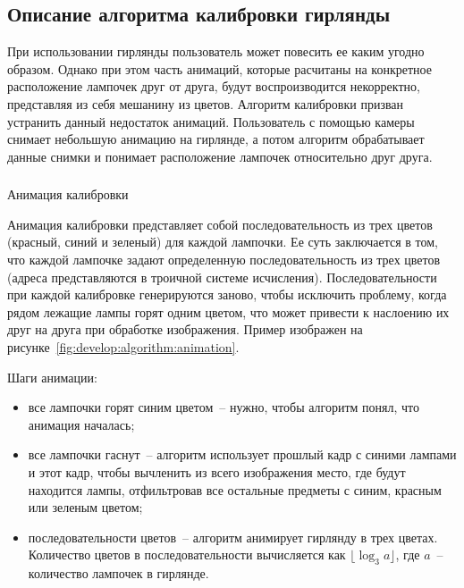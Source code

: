 \newpage
\subsection{Описание алгоритма калибровки гирлянды}
\label{sec:develop:algorithm}

При использовании гирлянды пользователь может повесить ее каким угодно образом. Однако при этом часть анимаций, которые расчитаны на конкретное расположение лампочек друг от друга, будут воспроизводится некорректно, представляя из себя мешанину из цветов. Алгоритм калибровки призван устранить данный недостаток анимаций. Пользователь с помощью камеры снимает небольшую анимацию на гирлянде, а потом алгоритм обрабатывает данные снимки и понимает расположение лампочек относительно друг друга.

\subsubsection{} Анимация калибровки
\label{sec:develop:algorithm:animation}

Анимация калибровки представляет собой последовательность из трех цветов (красный, синий и зеленый) для каждой лампочки. Ее суть заключается в том, что каждой лампочке задают определенную последовательность из трех цветов (адреса представляются в троичной системе исчисления). Последовательности при каждой калибровке генерируются заново, чтобы исключить проблему, когда рядом лежащие лампы горят одним цветом, что может привести к наслоению их друг на друга при обработке изображения. Пример изображен на рисунке~\ref{fig:develop:algorithm:animation}.

Шаги анимации:
\begin{itemize}
	\item все лампочки горят синим цветом~-- нужно, чтобы алгоритм понял, что анимация началась;
	\item все лампочки гаснут~-- алгоритм использует прошлый кадр с синими лампами и этот кадр, чтобы вычленить из всего изображения место, где будут находится лампы, отфильтровав все остальные предметы с синим, красным или зеленым цветом;
	\item последовательности цветов~-- алгоритм анимирует гирлянду в трех цветах. Количество цветов в последовательности вычисляется как $\lfloor\log_3 a\rfloor$, где $a$~-- количество лампочек в гирлянде.
\end{itemize}


